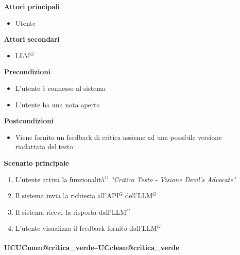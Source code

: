 \documentclass[a4paper,10pt]{article}
\makeatletter
\def\UCText#1{UC\csname UCnum@#1\endcsname\space--\space\csname UCclean@#1\endcsname}%
\makeatother
\begin{document}
    \textbf{Attori principali}
    \begin{itemize}
        \item Utente
    \end{itemize}
    \textbf{Attori secondari}
    \begin{itemize}
        \item LLM$^G$
    \end{itemize}
    \textbf{Precondizioni}
    \begin{itemize}
        \item L'utente è connesso al sistema
        \item L'utente ha una nota aperta
    \end{itemize}
    \textbf{Postcondizioni}
    \begin{itemize}
        \item Viene fornito un feedback di critica assieme ad una possibile versione riadattata del testo
    \end{itemize}
    \textbf{Scenario principale}
    \begin{enumerate}
        \item L'utente attiva la funzionalità$^G$ \textit{"Critica Testo - Visione Devil's Advocate"}
        \item Il sistema invia la richiesta all'API$^G$ dell'LLM$^G$
        \item Il sistema riceve la risposta dall'LLM$^G$
        \item L'utente visualizza il feedback fornito dall'LLM$^G$
    \end{enumerate}

    \paragraph{\UCText{critica_verde}}
\end{document}
